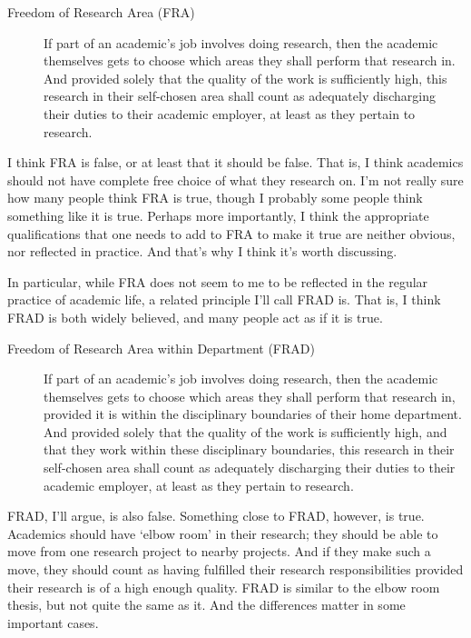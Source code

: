 \documentclass[
  11pt,
  letterpaper,
  DIV=11,
  numbers=noendperiod,
  twoside]{scrartcl}
\begin{document}
\begin{description}
\item[Freedom of Research Area (FRA)]
If part of an academic's job involves doing research, then the academic
themselves gets to choose which areas they shall perform that research
in. And provided solely that the quality of the work is sufficiently
high, this research in their self-chosen area shall count as adequately
discharging their duties to their academic employer, at least as they
pertain to research.
\end{description}

I think FRA is false, or at least that it should be false. That is, I
think academics should not have complete free choice of what they
research on. I'm not really sure how many people think FRA is true,
though I probably some people think something like it is true. Perhaps
more importantly, I think the appropriate qualifications that one needs
to add to FRA to make it true are neither obvious, nor reflected in
practice. And that's why I think it's worth discussing.

In particular, while FRA does not seem to me to be reflected in the
regular practice of academic life, a related principle I'll call FRAD
is. That is, I think FRAD is both widely believed, and many people act
as if it is true.

\begin{description}
\item[Freedom of Research Area within Department (FRAD)]
If part of an academic's job involves doing research, then the academic
themselves gets to choose which areas they shall perform that research
in, provided it is within the disciplinary boundaries of their home
department. And provided solely that the quality of the work is
sufficiently high, and that they work within these disciplinary
boundaries, this research in their self-chosen area shall count as
adequately discharging their duties to their academic employer, at least
as they pertain to research.
\end{description}

FRAD, I'll argue, is also false. Something close to FRAD, however, is
true. Academics should have `elbow room' in their research; they should
be able to move from one research project to nearby projects. And if
they make such a move, they should count as having fulfilled their
research responsibilities provided their research is of a high enough
quality. FRAD is similar to the elbow room thesis, but not quite the
same as it. And the differences matter in some important cases.
\end{document}
